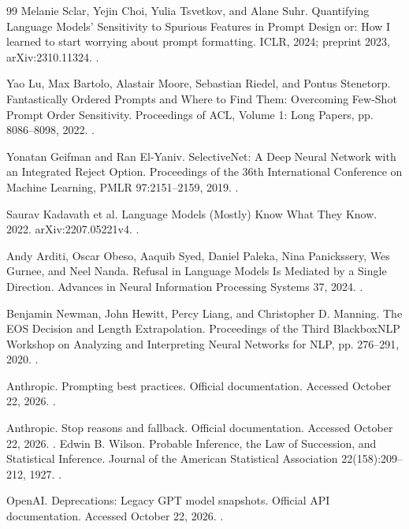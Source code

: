 \begin{thebibliography}{99}
Melanie Sclar, Yejin Choi, Yulia Tsvetkov, and Alane Suhr. Quantifying Language Models' Sensitivity to Spurious Features in Prompt Design or: How I learned to start worrying about prompt formatting. ICLR, 2024; preprint 2023, arXiv:2310.11324. .

Yao Lu, Max Bartolo, Alastair Moore, Sebastian Riedel, and Pontus Stenetorp. Fantastically Ordered Prompts and Where to Find Them: Overcoming Few-Shot Prompt Order Sensitivity. Proceedings of ACL, Volume 1: Long Papers, pp. 8086--8098, 2022. .

Yonatan Geifman and Ran El-Yaniv. SelectiveNet: A Deep Neural Network with an Integrated Reject Option. Proceedings of the 36th International Conference on Machine Learning, PMLR 97:2151--2159, 2019. .

Saurav Kadavath et al. Language Models (Mostly) Know What They Know. 2022. arXiv:2207.05221v4. .

Andy Arditi, Oscar Obeso, Aaquib Syed, Daniel Paleka, Nina Panickssery, Wes Gurnee, and Neel Nanda. Refusal in Language Models Is Mediated by a Single Direction. Advances in Neural Information Processing Systems 37, 2024. .

Benjamin Newman, John Hewitt, Percy Liang, and Christopher D. Manning. The EOS Decision and Length Extrapolation. Proceedings of the Third BlackboxNLP Workshop on Analyzing and Interpreting Neural Networks for NLP, pp. 276--291, 2020. .

Anthropic. Prompting best practices. Official documentation. Accessed October 22, 2026. .

Anthropic. Stop reasons and fallback. Official documentation. Accessed October 22, 2026. .
Edwin B. Wilson. Probable Inference, the Law of Succession, and Statistical Inference. Journal of the American Statistical Association 22(158):209--212, 1927. .

OpenAI. Deprecations: Legacy GPT model snapshots. Official API documentation. Accessed October 22, 2026. .
\end{thebibliography}
